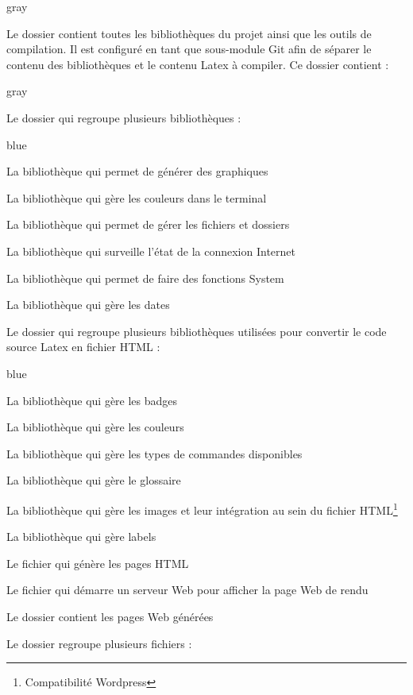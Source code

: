 {\begin{items}{gray}{\faFolder}
    \item Le dossier  contient toutes les bibliothèques du projet ainsi que les outils de compilation. 
    Il est configuré en tant que sous-module Git afin de séparer le contenu des bibliothèques et le contenu Latex à compiler.
    Ce dossier contient :
    \begin{items}{gray}{\faFolder}

        \item Le dossier  qui regroupe plusieurs bibliothèques : 

        \begin{items}{blue}{}
            \item La bibliothèque  qui permet de générer des graphiques
            \item La bibliothèque  qui gère les couleurs dans le terminal
            \item La bibliothèque  qui permet de gérer les fichiers et dossiers
            \item La bibliothèque  qui surveille l'état de la connexion Internet
            \item La bibliothèque  qui permet de faire des fonctions System
            \item La bibliothèque  qui gère les dates
        \end{items}

        \item Le dossier  qui regroupe plusieurs bibliothèques utilisées pour convertir le code source Latex en fichier HTML : 

        \begin{items}{blue}{}
            \item La bibliothèque  qui gère les badges
            \item La bibliothèque  qui gère les couleurs
            \item La bibliothèque  qui gère les types de commandes disponibles
            \item La bibliothèque  qui gère le glossaire
            \item La bibliothèque  qui gère les images et leur intégration au sein du fichier HTML\footnote{Compatibilité Wordpress}
            \item La bibliothèque  qui gère labels
            \item Le fichier  qui génère les pages HTML
            \item Le fichier  qui démarre un serveur Web pour afficher la page Web de rendu
            \item Le dossier  contient les pages Web générées
        \end{items}
        \item Le dossier  regroupe plusieurs fichiers : 


\end{items}
\end{items}}
